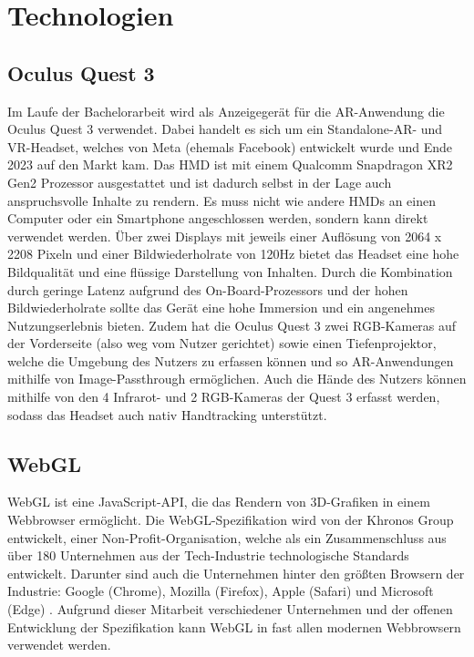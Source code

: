 \chapter{Technologien}

\section{Oculus Quest 3}

Im Laufe der Bachelorarbeit wird als Anzeigegerät für die AR-Anwendung die Oculus Quest 3 verwendet.
Dabei handelt es sich um ein Standalone-AR- und VR-Headset, welches von Meta (ehemals Facebook) entwickelt wurde und Ende 2023 auf den Markt kam.
Das HMD ist mit einem Qualcomm Snapdragon XR2 Gen2 Prozessor ausgestattet und ist dadurch selbst in der Lage auch anspruchsvolle Inhalte zu rendern.
Es muss nicht wie andere HMDs an einen Computer oder ein Smartphone angeschlossen werden, sondern kann direkt verwendet werden.
Über zwei Displays mit jeweils einer Auflösung von 2064 x 2208 Pixeln und einer Bildwiederholrate von 120Hz bietet das Headset eine hohe Bildqualität und eine flüssige Darstellung von Inhalten.
Durch die Kombination durch geringe Latenz aufgrund des On-Board-Prozessors und der hohen Bildwiederholrate sollte das Gerät eine hohe Immersion und ein angenehmes Nutzungserlebnis bieten.
Zudem hat die Oculus Quest 3 zwei RGB-Kameras auf der Vorderseite (also weg vom Nutzer gerichtet) sowie einen Tiefenprojektor, welche die Umgebung des Nutzers zu erfassen können und so AR-Anwendungen mithilfe von Image-Passthrough ermöglichen.
Auch die Hände des Nutzers können mithilfe von den 4 Infrarot- und 2 RGB-Kameras der Quest 3 erfasst werden, sodass das Headset auch nativ Handtracking unterstützt.
\autocite[]{meta-quest-3}


\section{WebGL}

WebGL ist eine JavaScript-API, die das Rendern von 3D-Grafiken in einem Webbrowser ermöglicht.
Die WebGL-Spezifikation wird von der Khronos Group entwickelt, einer Non-Profit-Organisation, welche als ein Zusammenschluss aus über 180 Unternehmen aus der Tech-Industrie technologische Standards entwickelt.
Darunter sind auch die Unternehmen hinter den größten Browsern der Industrie: Google (Chrome), Mozilla (Firefox), Apple (Safari) und Microsoft (Edge) \autocite[]{khronos-webgl, khronos-about}.
Aufgrund dieser Mitarbeit verschiedener Unternehmen und der offenen Entwicklung der Spezifikation kann WebGL in fast allen modernen Webbrowsern verwendet werden.

